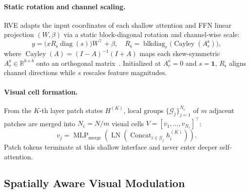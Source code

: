 \paragraph{Static rotation and channel scaling.}
RVE adapts the input coordinates of each shallow attention and FFN linear
projection $(W,\beta)$ via a static block-diagonal rotation and channel-wise
scale:
\begin{equation}
y=\bigl(xR_{\mathrm s}\operatorname{diag}(s)\bigr)W^\top+\beta,
\quad
R_{\mathrm s}=\operatorname{blkdiag}_{r}\bigl(\operatorname{Cayley}(A_r^{\mathrm s})\bigr),
\label{eq:static}
\end{equation}
where $\operatorname{Cayley}(A)=(I-A)^{-1}(I+A)$ maps each skew-symmetric
$A_r^{\mathrm s}\in\mathbb{R}^{b\times b}$ onto an orthogonal
matrix~\citep{golub2013matrix}. Initialized at $A_r^{\mathrm s}{=}0$ and
$s{=}\mathbf{1}$, $R_{\mathrm s}$ aligns channel directions while $s$ rescales
feature magnitudes.

\paragraph{Visual cell formation.}
From the $K$-th layer patch states $H^{(K)}$, local groups
$\{\mathcal{G}_j\}_{j=1}^{N_c}$ of $m$ adjacent patches are merged into
$N_c{=}N/m$ visual cells $V=[v_1,\ldots,v_{N_c}]^\top$:
\begin{equation}
v_j=\operatorname{MLP}_{\mathrm{merge}}\!\left(
\operatorname{LN}\!\left(
\operatorname{Concat}_{i\in\mathcal{G}_j}h_i^{(K)}
\right)\right).
\label{eq:merge}
\end{equation}
Patch tokens terminate at this shallow interface and never enter deeper
self-attention.

\subsection{Spatially Aware Visual Modulation}
\label{sec:dynamic}

